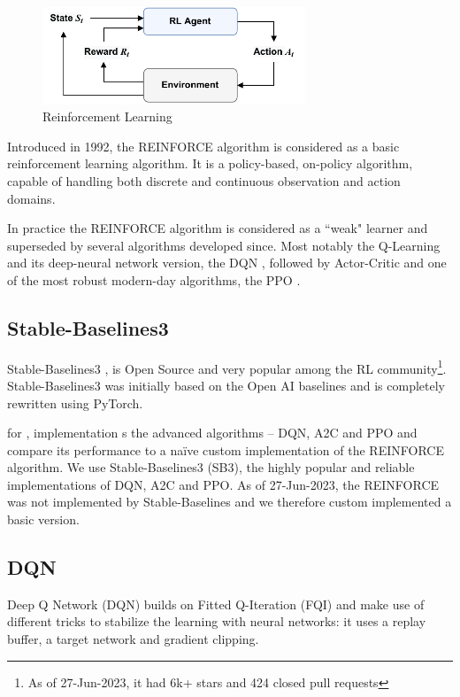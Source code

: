 \documentclass[a4paper, 12pt]{article}
\begin{document}
\begin{figure}[!h]
	\centering
	\includegraphics[width=0.7\textwidth]{RL-loop.pdf}
	\caption{Reinforcement Learning}
	\label{fig:RL-loop}
\end{figure}

Introduced in 1992, the REINFORCE algorithm \citep{REINFORCE-williams1992} is considered as a basic reinforcement learning algorithm. It is a policy-based, on-policy algorithm, capable of handling both discrete and continuous observation and action domains.

In practice the REINFORCE algorithm is considered as a ``weak" learner and superseded by several algorithms developed since. Most notably the Q-Learning and its deep-neural network version, the DQN \citep{DQN-mnih2013}, followed by Actor-Critic \citep{A2C-mnih2016} and one of the most robust modern-day algorithms, the PPO \citep{PPO-schulman2017}.

\subsection{Stable-Baselines3}
Stable-Baselines3 \cite{SB3-paper}, is Open Source and very popular among the RL community\footnote{As of 27-Jun-2023, it had 6k+ stars and 424 closed pull requests}. Stable-Baselines3 was initially based on the Open AI baselines \citep{OpenAI-baselines} and is completely rewritten using PyTorch. 


 for  , implementation s  the advanced algorithms -- DQN, A2C and PPO and compare its performance to a na\"ive custom implementation of the REINFORCE algorithm. We use Stable-Baselines3 (SB3), the highly popular and reliable implementations of DQN, A2C and PPO. As of 27-Jun-2023, the REINFORCE was not implemented by Stable-Baselines and we therefore custom implemented a basic version. 

\subsection{DQN}
Deep Q Network (DQN) builds on Fitted Q-Iteration (FQI) \citep{riedmiller2005neural} and make use of different tricks to stabilize the learning with neural networks: it uses a replay buffer, a target network and gradient clipping.
\end{document}
